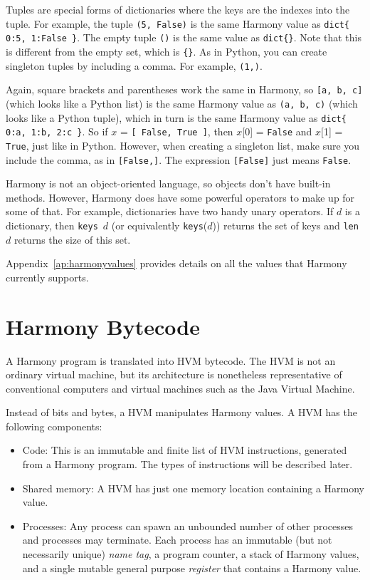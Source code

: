 \documentclass{report}
\begin{document}
Tuples are special forms of dictionaries where the keys are
the indexes into the tuple.  For example, the tuple
\texttt{(5, False)} is the same Harmony value as
\texttt{dict\{ 0:5, 1:False \}}.
The empty tuple \texttt{()} is the same value as \texttt{dict\{\}}.
Note that this is different from the empty set, which is \texttt{\{\}}.
As in Python, you can create singleton tuples by including a comma.
For example, \texttt{(1,)}.

Again, square brackets and parentheses work the same in Harmony, so
\texttt{[a, b, c]} (which looks like a Python list)
is the same Harmony value as \texttt{(a, b, c)} (which looks like a Python tuple),
which in turn is the same Harmony value as \texttt{dict\{ 0:a, 1:b, 2:c \}}.
So if $x$ = \texttt{[ False, True ]},
then $x$[0] = \texttt{False} and $x$[1] = \texttt{True}, just like in Python.
However, when creating a singleton list, make sure you include the
comma, as in \texttt{[False,]}.  The expression \texttt{[False]} just means
\texttt{False}.

Harmony is not an object-oriented language, so objects don't have
built-in methods.  However, Harmony does have some powerful operators to
make up for some of that.
For example, dictionaries have two handy unary operators.
If $d$ is a
dictionary, then \texttt{keys}~$d$ (or equivalently \texttt{keys}($d$))
returns the set of keys and \texttt{len}~$d$ returns the size of
this set.

Appendix~\ref{ap:harmonyvalues} provides details on all the values that
Harmony currently supports.

\section*{Harmony Bytecode}

A Harmony program is translated into HVM bytecode.
The HVM is not an ordinary virtual machine, but its architecture
is nonetheless representative of conventional computers and
virtual machines such as the Java Virtual Machine.

Instead of bits and bytes, a HVM manipulates Harmony values.
A HVM has the following components:
\begin{itemize}
\item Code:  This is an immutable and finite list of HVM instructions,
generated from a Harmony program.  The types of instructions will be described later.
\item Shared memory: A HVM has just one memory location containing
a Harmony value.
\item Processes:  Any process
can spawn an unbounded number of other processes and processes may terminate.
Each process has an immutable (but not necessarily unique) \emph{name tag},
%
a program counter,
%
a stack of Harmony values,
and a single mutable general purpose \emph{register}
%
that contains a Harmony value.
\end{itemize}
\end{document}
